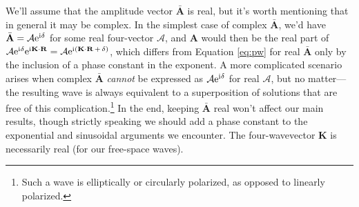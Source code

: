 \documentclass[12pt]{article}
\renewcommand{\vv}[1]{\mathbf{#1}}
\begin{document}
We'll assume that the amplitude vector $\bar{\vv A}$ is real, but it's worth mentioning that in general it may be complex. In the simplest case of complex $\bar{\vv A}$, we'd have $\bar{\vv A} = \mathcal{A} \mathrm{e}^{\mathrm{i} \mkern.5mu \delta}$ for some real four-vector $\mathcal{A}$, and $\vv A$ would then be the real part of ${\mathcal{A} \mathrm{e}^{\mathrm{i} \mkern.5mu \delta} \mathrm{e}^{\mathrm{i} \mkern.5mu \vv K \cdot \vv R} = \mathcal{A} \mathrm{e}^{\mathrm{i} \mkern.5mu ( \vv K \cdot \vv R \, + \, \delta )}}$, which differs from Equation \ref{eq:pw} for real $\bar{\vv A}$ only by the inclusion of a phase constant in the exponent. A more complicated scenario arises when complex $\bar{\vv A}$ \emph{cannot} be expressed as $\mathcal{A} \mathrm{e}^{\mathrm{i} \mkern.5mu \delta}$ for real $\mathcal{A}$, but no matter---the resulting wave is always equivalent to a superposition of solutions that are free of this complication.\footnote{Such a wave is elliptically or circularly polarized, as opposed to linearly polarized.} In the end, keeping $\bar{\vv A}$ real won't affect our main results, though strictly speaking we should add a phase constant to the exponential and sinusoidal arguments we encounter. The four-wavevector $\vv K$ is necessarily real (for our free-space waves).
\end{document}
